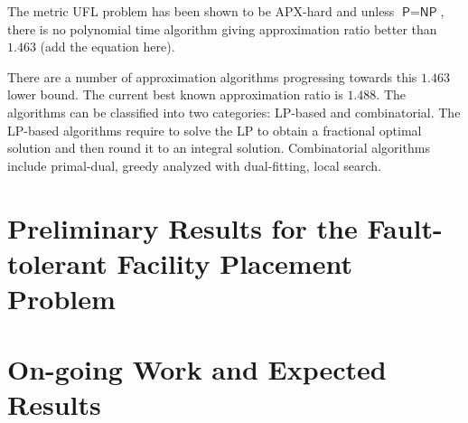 \documentclass{article}
\newcommand{\PP}{\textsf{P}}
\newcommand{\NP}{\textsf{NP}}
\begin{document}
The metric UFL problem has been shown to be APX-hard and unless $\PP
= \NP$, there is no polynomial time algorithm giving approximation
ratio better than $1.463$ (add the equation here).

There are a number of approximation algorithms progressing towards
this $1.463$ lower bound. The current best known approximation ratio
is $1.488$.  The algorithms can be classified into two categories:
LP-based and combinatorial. The LP-based algorithms require to solve
the LP to obtain a fractional optimal solution and then round it to an
integral solution. Combinatorial algorithms include primal-dual,
greedy analyzed with dual-fitting, local search.

\section{Preliminary Results for the Fault-tolerant Facility Placement
  Problem}

\section{On-going Work and Expected Results}
\end{document}
